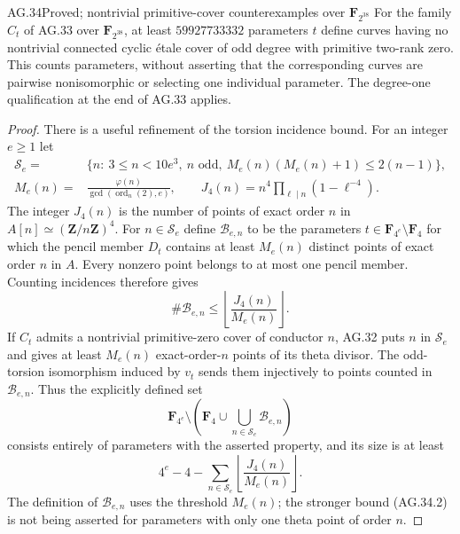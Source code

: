 \begin{claim}{AG.34}{Proved; nontrivial primitive-cover counterexamples over $\mathbf F_{2^{38}}$}
For the family $C_t$ of AG.33 over $\mathbf F_{2^{38}}$,
at least $59927733332$ parameters $t$ define curves having
no nontrivial connected cyclic \'etale cover of odd degree
with primitive two-rank zero. This counts parameters,
without asserting that the corresponding curves are
pairwise nonisomorphic or selecting one individual parameter.
The degree-one qualification at the end of AG.33 applies.
\end{claim}
\begin{proof}
There is a useful refinement of the torsion incidence bound.
For an integer $e\ge1$ let
\[
\begin{split}
 \mathcal S_e={}&\{n:\ 3\le n<10e^3,\ n\text{ odd},\
       M_e(n)(M_e(n)+1)\le2(n-1)\},\\
 M_e(n)={}&\frac{\varphi(n)}{\gcd(\operatorname{ord}_n(2),e)},\qquad
 J_4(n)=n^4\prod_{\ell\mid n}(1-\ell^{-4}).
\end{split}                                                   \tag{AG.34.1}
\]
The integer $J_4(n)$ is the number of points of exact order
$n$ in $A[n]\simeq(\mathbf Z/n\mathbf Z)^4$.
For $n\in\mathcal S_e$ define $\mathcal B_{e,n}$ to be
the parameters $t\in\mathbf F_{4^e}\setminus\mathbf F_4$
for which the pencil member $D_t$ contains at least
$M_e(n)$ distinct points of exact order $n$ in $A$.
Every nonzero point belongs to at most one pencil member.
Counting incidences therefore gives
\[
               \#\mathcal B_{e,n}
                  \le\left\lfloor\frac{J_4(n)}{M_e(n)}\right\rfloor.
                                                               \tag{AG.34.2}
\]
If $C_t$ admits a nontrivial primitive-zero cover of
conductor $n$, AG.32 puts $n$ in $\mathcal S_e$ and gives
at least $M_e(n)$ exact-order-$n$ points of its theta
divisor. The odd-torsion isomorphism induced by $v_t$
sends them injectively to points counted in
$\mathcal B_{e,n}$. Thus the explicitly defined set
\[
 \mathbf F_{4^e}\setminus
       \left(\mathbf F_4\cup
          \bigcup_{n\in\mathcal S_e}\mathcal B_{e,n}\right)
                                                               \tag{AG.34.3}
\]
consists entirely of parameters with the asserted property,
and its size is at least
\[
       4^e-4-
       \sum_{n\in\mathcal S_e}
          \left\lfloor\frac{J_4(n)}{M_e(n)}\right\rfloor.
                                                               \tag{AG.34.4}
\]
The definition of $\mathcal B_{e,n}$ uses the threshold
$M_e(n)$; the stronger bound (AG.34.2) is not being asserted
for parameters with only one theta point of order $n$.


\end{proof}
